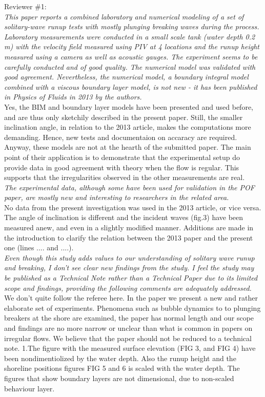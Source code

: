 \newcommand{\refpoint}[1]{\ \vspace{0.3cm}\\ {\em #1}\  \vspace{0.3cm}\\ }
Reviewer \#1:
\refpoint{This paper reports a combined laboratory and numerical modeling of a set of solitary-wave runup tests 
with mostly plunging breaking waves during the process.  Laboratory measurements were conducted in a small scale tank 
(water depth 0.2 m) with the velocity field measured using PIV at 4 locations and the runup height measured using a 
camera as well as acoustic gauges.  The experiment seems to be carefully conducted and of good quality.  The numerical
 model was validated with good agreement.  Nevertheless, the numerical model, a boundary integral model combined with a
 viscous boundary layer model, is not new - it has been published in Physics of Fluids in 2013 by the authors.}
Yes, the BIM and boundary layer models have been presented and used before, and are thus only sketchily described 
in the present paper. Still, the smaller inclination angle, in relation to the 2013 article, makes the 
computations more demanding. Hence, new tests and documentaion on accaracy are required.\\
Anyway, these models are not at the hearth of the submitted paper.
The main point of their application  is to demonstrate that the experimental setup do
provide data in good agreement with theory when the flow is regular. This supports that the irregularities
observed in the other measurements are real.   
 \refpoint{The 
experimental data, although some have been used for validation in the POF paper, are mostly new and interesting to 
researchers in the related area.}
No data from the present investigation was used in the 2013 article, or vice versa. The angle of inclination
is different and the incident waves (fig.3) have been measured anew, and even in a slightly modified manner. 
Additions are made in the introduction to clarify the relation between the 2013 paper and the present one
(lines ....  and ....).
\refpoint{ Even though this study adds values to our understanding of solitary wave runup and 
breaking, I don't see clear new findings from the study.
 I feel the study may be published as a Technical Note rather than a Technical Paper due to its limited scope and 
findings, providing the following comments are adequately addressed.}
We don't quite follow the referee here. In the paper we present a new and rather elaborate set of experiments.
Phenomena such as bubble dynamics to to plunging breakers at the shore are examined, 
the paper has normal length and our scope and findings are no more narrow or unclear than what is common in 
papers on irregular flows.
We believe that the paper should not be reduced to a technical note. 
1.The figure with the measured surface elevation (FIG 3, and  FIG 4) have been  nondimentiolized  by the water depth. Also the runup height and the shoreline positions figures FIG 5 and 6 is scaled with the water depth. The figures that show boundary layers are not dimensional, due to non-scaled behaviour layer. 


